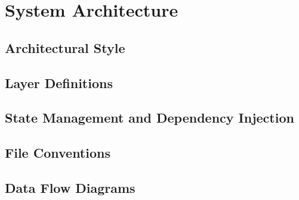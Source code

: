 %

\chapter{System Architecture}

\section{Architectural Style}

\section{Layer Definitions}

\section{State Management and Dependency Injection}

\section{File Conventions}

\section{Data Flow Diagrams}
